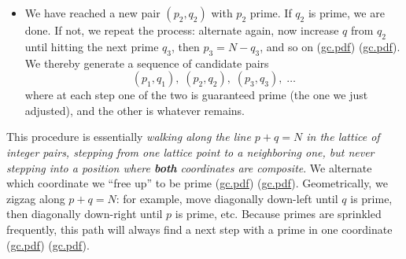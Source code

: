 \documentclass[12pt]{article}
\begin{document}
\begin{enumerate}[leftmargin=*, label=\arabic*.]
\begin{itemize}[leftmargin=*,label={--}]
    \item We have reached a new pair $(p_2,q_2)$ with $p_2$ prime. If $q_2$ is prime, we are done. If not, we repeat the process: alternate again, now increase $q$ from $q_2$ until hitting the next prime $q_3$, then $p_3 = N-q_3$, and so on (\href{file://file-7ZYYwSHWVa83XEVTrEhg5z#:~:text=%242N%24%20and%20gradually%20reach%20a,each%20step%20%24p_i%24%20is%20prime}{gc.pdf}) (\href{file://file-7ZYYwSHWVa83XEVTrEhg5z#:~:text=smallest%20prime%20%24p_0%3D2%24%20and%20let,min%7D%3D2N}{gc.pdf}). We thereby generate a sequence of candidate pairs 
    \[
    (p_1,q_1),\;(p_2,q_2),\;(p_3,q_3),\;\dots
    \]
    where at each step one of the two is guaranteed prime (the one we just adjusted), and the other is whatever remains.
  \end{itemize}
  This procedure is essentially \emph{walking along the line $p+q=N$ in the lattice of integer pairs, stepping from one lattice point to a neighboring one, but never stepping into a position where \textbf{both} coordinates are composite}. We alternate which coordinate we “free up” to be prime (\href{file://file-7ZYYwSHWVa83XEVTrEhg5z#:~:text=prime%E2%80%93prime%20pair%20exists,via%20small}{gc.pdf}) (\href{file://file-7ZYYwSHWVa83XEVTrEhg5z#:~:text=which%20coordinate%20plays%20the%20role,least%20one%20solution%20pair%20must}{gc.pdf}). Geometrically, we zigzag along $p+q=N$: for example, move diagonally down-left until $q$ is prime, then diagonally down-right until $p$ is prime, etc. Because primes are sprinkled frequently, this path will always find a next step with a prime in one coordinate (\href{file://file-7ZYYwSHWVa83XEVTrEhg5z#:~:text=%E2%80%9Cone,a%20sequence%20of%20candidate%20pairs}{gc.pdf}) (\href{file://file-7ZYYwSHWVa83XEVTrEhg5z#:~:text=only%20through%20points%20where%20one,more%20than%20a%20finite%20gap}{gc.pdf}).


\end{enumerate}
\end{document}
